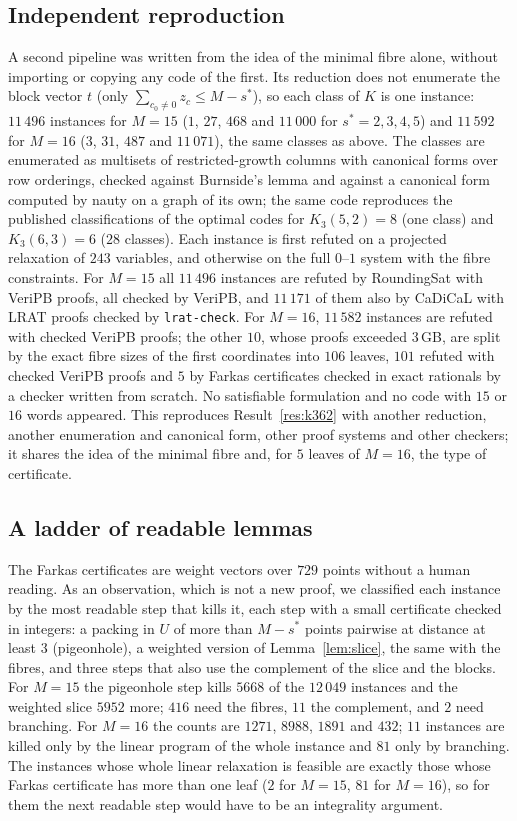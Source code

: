 \documentclass[11pt]{amsart}
\theoremstyle{definition}
\theoremstyle{remark}
\begin{document}
\subsection*{Independent reproduction}
A second pipeline was written from the idea of the minimal fibre alone, without importing or copying any code of the first.
Its reduction does not enumerate the block vector $t$ (only $\sum_{c_0\ne0}z_c\le M-s^*$), so each class of $K$ is one instance: $11\,496$ instances for $M=15$ ($1$, $27$, $468$ and $11\,000$ for $s^*=2,3,4,5$) and $11\,592$ for $M=16$ ($3$, $31$, $487$ and $11\,071$), the same classes as above.
The classes are enumerated as multisets of restricted-growth columns with canonical forms over row orderings, checked against Burnside's lemma and against a canonical form computed by nauty on a graph of its own; the same code reproduces the published classifications of the optimal codes for $K_3(5,2)=8$ (one class) and $K_3(6,3)=6$ ($28$ classes).
Each instance is first refuted on a projected relaxation of $243$ variables, and otherwise on the full $0$--$1$ system with the fibre constraints.
For $M=15$ all $11\,496$ instances are refuted by RoundingSat with VeriPB proofs, all checked by VeriPB, and $11\,171$ of them also by CaDiCaL with LRAT proofs checked by \texttt{lrat-check}.
For $M=16$, $11\,582$ instances are refuted with checked VeriPB proofs; the other $10$, whose proofs exceeded $3$\,GB, are split by the exact fibre sizes of the first coordinates into $106$ leaves, $101$ refuted with checked VeriPB proofs and $5$ by Farkas certificates checked in exact rationals by a checker written from scratch.
No satisfiable formulation and no code with $15$ or $16$ words appeared.
This reproduces Result~\ref{res:k362} with another reduction, another enumeration and canonical form, other proof systems and other checkers; it shares the idea of the minimal fibre and, for $5$ leaves of $M=16$, the type of certificate.

\subsection*{A ladder of readable lemmas}
The Farkas certificates are weight vectors over $729$ points without a human reading.
As an observation, which is not a new proof, we classified each instance by the most readable step that kills it, each step with a small certificate checked in integers: a packing in $U$ of more than $M-s^*$ points pairwise at distance at least $3$ (pigeonhole), a weighted version of Lemma~\ref{lem:slice}, the same with the fibres, and three steps that also use the complement of the slice and the blocks.
For $M=15$ the pigeonhole step kills $5668$ of the $12\,049$ instances and the weighted slice $5952$ more; $416$ need the fibres, $11$ the complement, and $2$ need branching.
For $M=16$ the counts are $1271$, $8988$, $1891$ and $432$; $11$ instances are killed only by the linear program of the whole instance and $81$ only by branching.
The instances whose whole linear relaxation is feasible are exactly those whose Farkas certificate has more than one leaf ($2$ for $M=15$, $81$ for $M=16$), so for them the next readable step would have to be an integrality argument.
\end{document}
